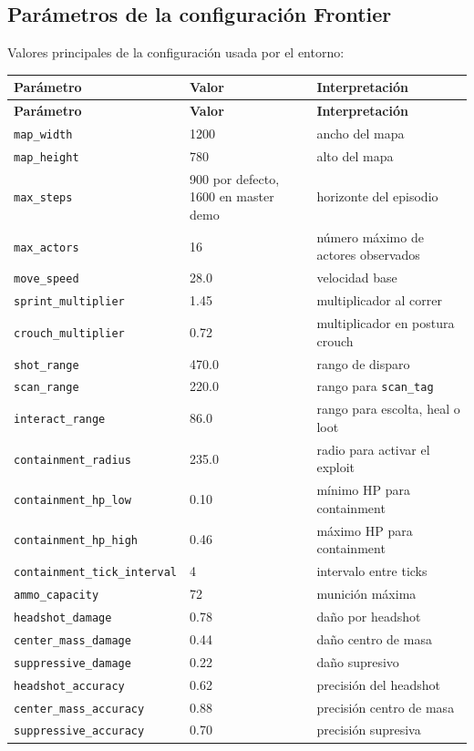 \documentclass[11pt]{article}
\begin{document}
\subsection{Parámetros de la configuración Frontier}
Valores principales de la configuración usada por el entorno:

\begin{longtable}{p{}p{}p{}}
\toprule
\textbf{Parámetro} & \textbf{Valor} & \textbf{Interpretación} \\
\midrule
\endfirsthead
\toprule
\textbf{Parámetro} & \textbf{Valor} & \textbf{Interpretación} \\
\midrule
\endhead
\texttt{map\_width} & 1200 & ancho del mapa \\
\texttt{map\_height} & 780 & alto del mapa \\
\texttt{max\_steps} & 900 por defecto, 1600 en master demo & horizonte del episodio \\
\texttt{max\_actors} & 16 & número máximo de actores observados \\
\texttt{move\_speed} & 28.0 & velocidad base \\
\texttt{sprint\_multiplier} & 1.45 & multiplicador al correr \\
\texttt{crouch\_multiplier} & 0.72 & multiplicador en postura crouch \\
\texttt{shot\_range} & 470.0 & rango de disparo \\
\texttt{scan\_range} & 220.0 & rango para \texttt{scan\_tag} \\
\texttt{interact\_range} & 86.0 & rango para escolta, heal o loot \\
\texttt{containment\_radius} & 235.0 & radio para activar el exploit \\
\texttt{containment\_hp\_low} & 0.10 & mínimo HP para containment \\
\texttt{containment\_hp\_high} & 0.46 & máximo HP para containment \\
\texttt{containment\_tick\_interval} & 4 & intervalo entre ticks \\
\texttt{ammo\_capacity} & 72 & munición máxima \\
\texttt{headshot\_damage} & 0.78 & daño por headshot \\
\texttt{center\_mass\_damage} & 0.44 & daño centro de masa \\
\texttt{suppressive\_damage} & 0.22 & daño supresivo \\
\texttt{headshot\_accuracy} & 0.62 & precisión del headshot \\
\texttt{center\_mass\_accuracy} & 0.88 & precisión centro de masa \\
\texttt{suppressive\_accuracy} & 0.70 & precisión supresiva \\
\bottomrule
\end{longtable}
\end{document}
